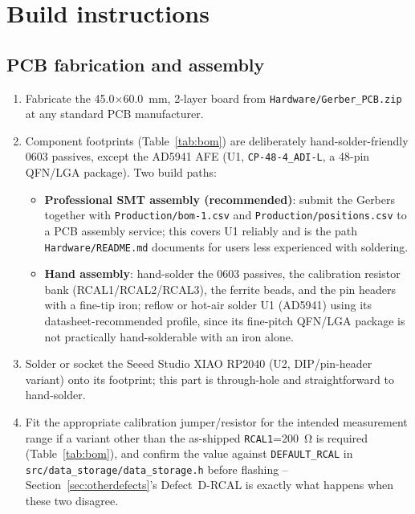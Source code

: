 \section{Build instructions}
\label{sec:build}


\subsection{PCB fabrication and assembly}
\begin{enumerate}
\item Fabricate the \SI{45.0}{}$\times$\SI{60.0}{\milli\metre}, 2-layer
  board from \texttt{Hardware/Gerber\_PCB.zip} at any standard PCB
  manufacturer.
\item Component footprints (Table~\ref{tab:bom}) are deliberately
  hand-solder-friendly 0603 passives, except the AD5941 AFE (U1,
  \texttt{CP-48-4\_ADI-L}, a 48-pin QFN/LGA package). Two build paths:
  \begin{itemize}
  \item \textbf{Professional SMT assembly (recommended)}: submit the
    Gerbers together with \texttt{Production/\allowbreak bom-1.csv} and
    \texttt{Production/\allowbreak positions.csv} to a PCB assembly
    service; this covers U1 reliably and is the path
    \texttt{Hardware/README.md} documents for users less experienced
    with soldering.
  \item \textbf{Hand assembly}: hand-solder the 0603 passives, the
    calibration resistor bank (RCAL1/RCAL2/RCAL3), the ferrite beads, and
    the pin headers with a fine-tip iron; reflow or hot-air solder U1
    (AD5941) using its datasheet-recommended profile, since its
    fine-pitch QFN/LGA package is not practically hand-solderable with an
    iron alone.
  \end{itemize}
\item Solder or socket the Seeed Studio XIAO RP2040 (U2, DIP/pin-header
  variant) onto its footprint; this part is through-hole and
  straightforward to hand-solder.
\item Fit the appropriate calibration jumper/resistor for the intended
  measurement range if a variant other than the as-shipped
  \texttt{RCAL1}=\SI{200}{\ohm} is required (Table~\ref{tab:bom}), and
  confirm the value against \texttt{DEFAULT\_RCAL} in
  \texttt{src/data\_storage/data\_storage.h} before flashing --
  Section~\ref{sec:otherdefects}'s Defect~D-RCAL is exactly what happens
  when these two disagree.
\end{enumerate}

